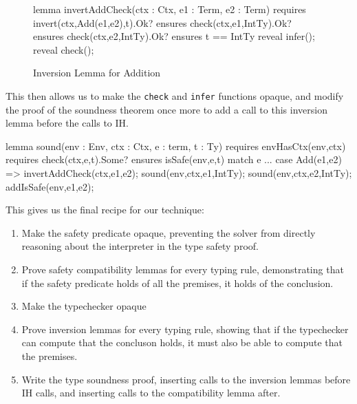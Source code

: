 \documentclass[sigplan,review,screen,anonymous]{acmart}
\newcommand{\comm}[3]{\textcolor{#1}{[#2: #3]}}
\newcommand{\jwc}[1]{\comm{dkgreen}{JWC}{#1}}
\begin{document}
\begin{figure}
\begin{dafny}
  lemma invertAddCheck(ctx : Ctx, e1 : Term, e2 : Term)
  requires invert(ctx,Add(e1,e2),t).Ok?
  ensures check(ctx,e1,IntTy).Ok?
  ensures check(ctx,e2,IntTy).Ok?
  ensures t == IntTy
{ reveal infer(); reveal check(); }
\end{dafny}

  \caption{Inversion Lemma for Addition}
  \label{fig:add-invert}
\end{figure}

This then allows us to make the \texttt{check} and \texttt{infer} functions opaque, and modify
the proof of the soundness theorem once more to add a call to this inversion lemma before the calls to IH.

\begin{dafny}
lemma sound(env : Env, ctx : Ctx, e : term, t : Ty)
  requires envHasCtx(env,ctx)
  requires check(ctx,e,t).Some?
  ensures isSafe(env,e,t)
{
  match e {
    ...
    case Add(e1,e2) =>
      invertAddCheck(ctx,e1,e2);
      sound(env,ctx,e1,IntTy);
      sound(env,ctx,e2,IntTy);
      addIsSafe(env,e1,e2);
  }
}
\end{dafny}

This gives us the final recipe for our technique:

\begin{enumerate}
  \item Make the safety predicate opaque, preventing the solver from directly reasoning about the interpreter in the type safety proof.
  \item Prove safety compatibility lemmas for every typing rule, demonstrating that if the safety predicate holds of all the premises, it holds of the conclusion.
  \item Make the typechecker opaque
  \item Prove inversion lemmas for every typing rule, showing that if the typechecker can compute that the concluson holds, it must also be able to compute that the premises.
  \item Write the type soundness proof, inserting calls to the inversion lemmas before IH calls, and inserting calls to the compatibility lemma after.
\end{enumerate}


\end{document}
